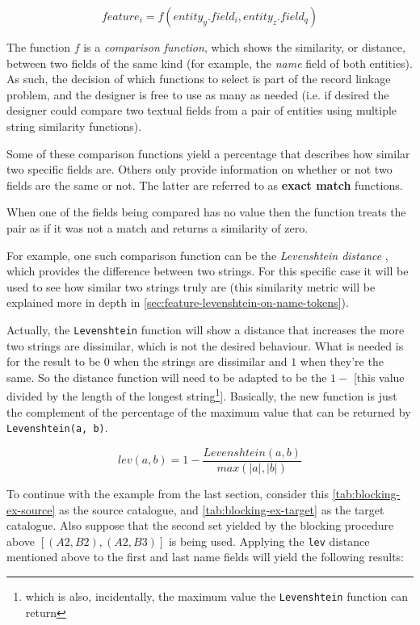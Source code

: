 \documentclass[epsfig,a4paper,11pt,titlepage,twoside,openany]{book}
\begin{document}
$$
feature_i = f(entity_y.field_i , entity_z.field_q)
$$

The function $f$ is a \textit{comparison function}, which shows the
similarity, or distance, between two fields of the same kind (for example, the \textit{name} field of both entities). As such, the decision of which functions to select is
part of the record linkage problem, and the designer is free to use as many as needed (i.e. if desired the designer could compare two textual fields from a pair of entities
using multiple string similarity functions).

Some of these comparison functions yield a percentage that describes how
similar two specific fields are. Others only provide information on whether or not two fields are the same or not. The latter are referred to as \textbf{exact match} functions.

When one of the fields being compared has no value then the function treats the
pair as if it was not a match and returns a similarity of zero.

For example, one such comparison function can be the \textit{Levenshtein distance} \cite{levenshtein1966binary}, which provides the difference between two strings. For this specific case it will be used to see how similar two strings truly are (this similarity metric will be explained more in depth in \autoref{sec:feature-levenshtein-on-name-tokens}). 

Actually, the \texttt{Levenshtein} function will show a distance that increases the more two strings are dissimilar, which is not the desired behaviour. What is needed is for the result to be $0$ when the strings are dissimilar and $1$ when they're the same. So the distance function will need to be adapted to be the $1 -$ [this value divided by the length of the longest string\footnote{which is also, incidentally, the maximum value the \texttt{Levenshtein} function can return}]. Basically, the new function is just the complement of the percentage of the maximum value that can be returned by \texttt{Levenshtein(a, b)}.

$$
lev(a,b) = 1 - \frac{Levenshtein(a, b)}{max(|a|, |b|)}
$$

To continue with the example from the last section, consider this \autoref{tab:blocking-ex-source} as the source catalogue, and \autoref{tab:blocking-ex-target} as the target catalogue. Also suppose that the second
set yielded by the blocking procedure above $[(A2, B2), (A2, B3)]$ is being used. Applying the
\texttt{lev} distance mentioned above to the first and last name fields will
yield the following results:
\end{document}
